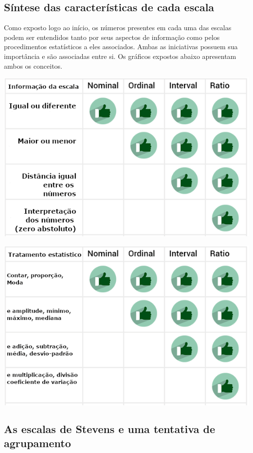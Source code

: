 \documentclass[
]{book}
\begin{document}
\hypertarget{suxedntese-das-caracteruxedsticas-de-cada-escala}{%
\subsection{Síntese das características de cada escala}\label{suxedntese-das-caracteruxedsticas-de-cada-escala}}

Como exposto logo ao início, os números presentes em cada uma das escalas podem ser entendidos tanto por seus aspectos de informação como pelos procedimentos estatísticos a eles associados. Ambas as iniciativas possuem sua importância e são associadas entre si. Os gráficos expostos abaixo apresentam ambos os conceitos.

\includegraphics{./img/cap_escala_medida_informacao.png}

\includegraphics{./img/cap_escala_medida_analises.png}

\hypertarget{as-escalas-de-stevens-e-uma-tentativa-de-agrupamento}{%
\subsection{As escalas de Stevens e uma tentativa de agrupamento}\label{as-escalas-de-stevens-e-uma-tentativa-de-agrupamento}}
\end{document}
